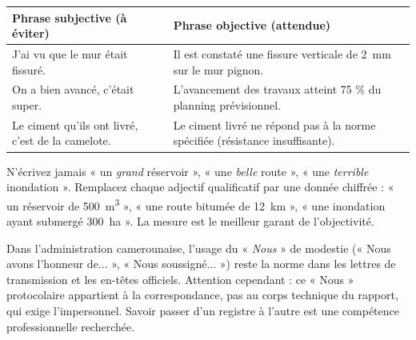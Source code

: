 \documentclass[11pt]{article}
\newcommand{\cle}[1]{{\popxbold\color{popdark}#1}}
\begin{document}
\begin{exemplebox}
\begin{center}
\begin{tabularx}{\linewidth}{|X|X|}
\hline
\rowcolor{popblueL} \textbf{Phrase subjective (à éviter)} & \textbf{Phrase objective (attendue)} \\
\hline
J'ai vu que le mur était fissuré. & Il est constaté une fissure verticale de \SI{2}{mm} sur le mur pignon. \\
\hline
On a bien avancé, c'était super. & L'avancement des travaux atteint 75 \% du planning prévisionnel. \\
\hline
Le ciment qu'ils ont livré, c'est de la camelote. & Le ciment livré ne répond pas à la norme spécifiée (résistance insuffisante). \\
\hline
\end{tabularx}
\end{center}
\end{exemplebox}

\begin{attention}
N'écrivez jamais « un \emph{grand} réservoir », « une \emph{belle} route », « une \emph{terrible} inondation ». Remplacez chaque adjectif qualificatif par une \cle{donnée chiffrée} : « un réservoir de \SI{500}{m^3} », « une route bitumée de \SI{12}{km} », « une inondation ayant submergé \SI{300}{ha} ». La mesure est le meilleur garant de l'objectivité.
\end{attention}

\begin{savaistu}
Dans l'administration camerounaise, l'usage du « \emph{Nous} » de modestie (« Nous avons l'honneur de... », « Nous soussigné... ») reste la norme dans les lettres de transmission et les en-têtes officiels. Attention cependant : ce « Nous » protocolaire appartient à la correspondance, pas au corps technique du rapport, qui exige l'impersonnel. Savoir passer d'un registre à l'autre est une compétence professionnelle recherchée.
\end{savaistu}
\end{document}
